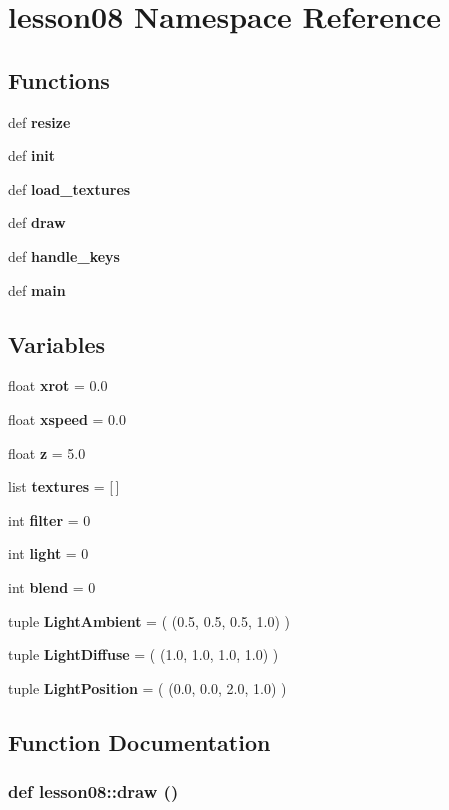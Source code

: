 \section{lesson08 Namespace Reference}
\label{namespacelesson08}


\subsection*{Functions}
\begin{CompactItemize}
\item 
def {\bf resize}
\item 
def {\bf init}
\item 
def {\bf load\_\-textures}
\item 
def {\bf draw}
\item 
def {\bf handle\_\-keys}
\item 
def {\bf main}
\end{CompactItemize}
\subsection*{Variables}
\begin{CompactItemize}
\item 
float {\bf xrot} = 0.0
\item 
float {\bf xspeed} = 0.0
\item 
float {\bf z} = 5.0
\item 
list {\bf textures} = [$\,$]
\item 
int {\bf filter} = 0
\item 
int {\bf light} = 0
\item 
int {\bf blend} = 0
\item 
tuple {\bf LightAmbient} = ( (0.5, 0.5, 0.5, 1.0) )
\item 
tuple {\bf LightDiffuse} = ( (1.0, 1.0, 1.0, 1.0) )
\item 
tuple {\bf LightPosition} = ( (0.0, 0.0, 2.0, 1.0) )
\end{CompactItemize}


\subsection{Function Documentation}
\subsubsection{\setlength{\rightskip}{0pt plus 5cm}def lesson08::draw ()}\label{namespacelesson08_9fdcd2b1a4f389cc994e298204e48076}




